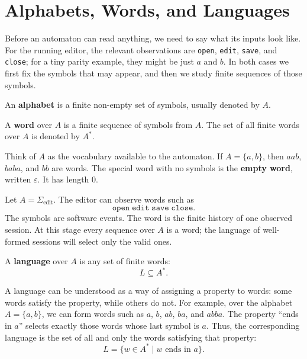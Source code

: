 \section{Alphabets, Words, and Languages}
\label{sec:alphabets-words}

Before an automaton can read anything, we need to say what its inputs
look like.  For the running editor, the relevant observations are
\texttt{open}, \texttt{edit}, \texttt{save}, and \texttt{close}; for a
tiny parity example, they might be just $a$ and $b$.  In both cases we
first fix the symbols that may
appear, and then we study finite sequences of those symbols.

\begin{definition}
\label{def:alphabet-word}
An \textbf{alphabet} is a finite non-empty set of symbols, usually
denoted by $A$.

A \textbf{word} over $A$ is a finite sequence of symbols from
$A$.  The set of all finite words over $A$ is denoted by
$A^*$.
\end{definition}

Think of $A$ as the vocabulary available to the automaton.  If
$A=\{a,b\}$, then $aab$, $baba$, and $bb$ are words.  The special
word with no symbols is the \textbf{empty word}, written $\varepsilon$.
It has length $0$.

\begin{example}
\label{ex:small-alphabet}
Let \(A=\Sigma_{\mathrm{edit}}\).  The editor can observe words such as
\[
  \texttt{open}\;\texttt{edit}\;\texttt{save}\;\texttt{close}.
\]
The symbols are software events.  The word is the finite history of one
observed session.  At this stage every sequence over \(A\) is a word;
the language of well-formed sessions will select only the valid ones.
\end{example}

\begin{definition}[Language]
\label{def:finite-language}
A \textbf{language} over $A$ is any set of finite words:
\[
  L \subseteq A^*.
\]
\end{definition}


A language can be understood as a way of assigning a property to words:
some words satisfy the property, while others do not. For example, over
the alphabet \(A=\{a,b\}\), we can form words such as \(a\), \(b\),
\(ab\), \(ba\), and \(abba\). The property ``ends in \(a\)'' selects
exactly those words whose last symbol is \(a\). Thus, the corresponding
language is the set of all and only the words satisfying that property:
\[
L = \{ w \in A^* \mid w \text{ ends in } a \}.
\]

